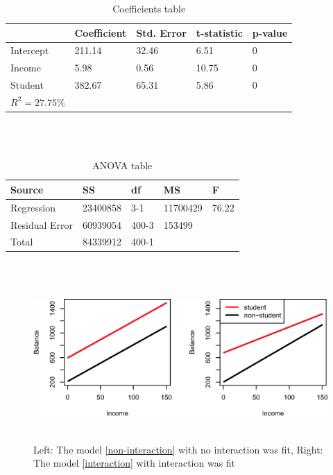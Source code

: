 \documentclass[12pt,a4paper]{article}%
\theoremstyle{definition}
\theoremstyle{plain}
\numberwithin{equation}{section}
\begin{document}
\begin{table}[H]
\centering
\begin{tabular}{l|llll}
  & Coefficient   & Std. Error     & t-statistic  & p-value \\
\hline
Intercept & 211.14 & 32.46 & 6.51  & 0 \\
Income    & 5.98   & 0.56  & 10.75 & 0 \\
Student   & 382.67 & 65.31 & 5.86  & 0 \\
\bottomrule
$R^{2}=27.75\% $ & & & & \\
\end{tabular}
\\~\\
\caption{Coefficients table}\label{Table}
\end{table}

\begin{table}[H]
\centering
\begin{tabular}{l|llll}
Source         & SS  		 & df    & MS  		& F \\
\hline
Regression     & 23400858    & 3-1   & 11700429 & 76.22  \\
Residual Error & 60939054    & 400-3 & 153499   &   \\
Total          & 84339912    & 400-1 &     		&   \\
\bottomrule
\end{tabular}
\\~\\
\caption{ANOVA table}\label{Table}
\end{table}

\begin{figure}[H]
\centering
\includegraphics[scale=0.9]{images//3_7.eps}
\\~\\
\caption{Left: The model \eqref{non-interaction} with no interaction was fit, Right: The model \eqref{interaction} with interaction was fit }\label{figure-3.7}
\end{figure}
\end{document}
